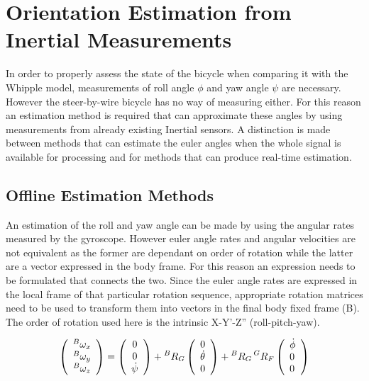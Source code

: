 \chapter{Orientation Estimation from Inertial Measurements} \label{app:B}

In order to properly assess the state of the bicycle when comparing it with the Whipple model, measurements of roll angle \ensuremath{\phi} and yaw angle \ensuremath{\psi} are necessary. However the steer-by-wire bicycle has no way of measuring either. For this reason an estimation method is required that can approximate these angles by using measurements from already existing Inertial sensors. A distinction is made between methods that can estimate the euler angles when the whole signal is available for processing and for methods that can produce real-time estimation.  

\section{Offline Estimation Methods}

 An estimation of the roll and yaw angle can be made by using the angular rates measured by the gyroscope. However euler angle rates and angular velocities are not equivalent as the former are dependant on order of rotation while the latter are  a vector expressed in the body frame. For this reason an expression needs to be formulated that connects the two. Since the euler angle rates are expressed in the local frame of that particular rotation sequence, appropriate rotation matrices need to be used to transform them into vectors in the final body fixed frame (B). The order of rotation used here is the intrinsic X-Y'-Z'' (roll-pitch-yaw). 

    \begin{equation}
    \left(\begin{array}{c}{\prescript{B}{}{\omega_{x}}} \\ {\prescript{B}{}{\omega_{y}}} \\ {\prescript{B}{}{\omega_{z}}}\end{array}\right)=\left(\begin{array}{c}{0} \\ {0} \\ {\dot{\psi}}\end{array}\right)+\prescript{B}{}{R_G}\left(\begin{array}{l}{0} \\ {\dot{\theta}} \\ {0}\end{array}\right)+\prescript{B}{}{R_G} \prescript{G}{}{R_F}\left(\begin{array}{l}{\dot{\phi}} \\ {0} \\ {0}\end{array}\right)
    \end{equation}

